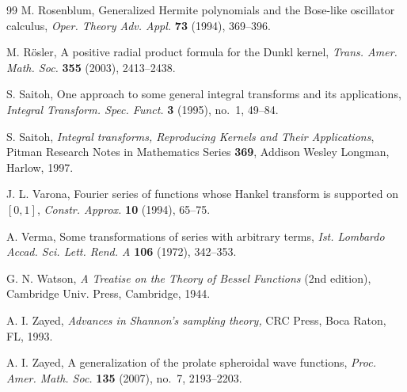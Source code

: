 \documentclass[11pt,a4paper]{amsart}
\theoremstyle{plain}
\theoremstyle{definition}
\begin{document}
\begin{thebibliography}{99}
 M. Rosenblum, {Generalized Hermite polynomials and the
Bose-like oscillator calculus,} \textit{Oper. Theory Adv. Appl.} \textbf{73}
(1994), 369--396.

 M. R\"osler, {A positive radial product formula
for the Dunkl kernel,} \textit{Trans. Amer. Math. Soc.} \textbf{355}
(2003), 2413--2438.

 S. Saitoh, {One approach to some general integral
transforms and its applications}, \textit{Integral Transform. Spec. Funct.}
\textbf{3} (1995), no.~1, 49--84.

 S. Saitoh, \textit{Integral transforms, Reproducing Kernels and Their Applications},
Pitman Research Notes in Mathematics Series \textbf{369},
Addison Wesley Longman, Harlow, 1997.

 J. L. Varona, {Fourier series of functions whose Hankel transform is supported on $[0,1]$}, 
\textit{Constr. Approx.} \textbf{10} (1994), 65--75.

 A. Verma, {Some transformations of series with arbitrary terms}, 
\textit{Ist. Lombardo Accad. Sci. Lett. Rend. A} \textbf{106} (1972), 342--353.

 G. N. Watson, \textit{A Treatise on the Theory of
Bessel Functions} (2nd edition), Cambridge Univ. Press,
Cambridge, 1944.

 A. I. Zayed, \textit{Advances in Shannon's sampling theory,} 
CRC Press, Boca Raton, FL, 1993.

 A. I. Zayed, {A generalization of the prolate spheroidal wave
functions,} \textit{Proc. Amer. Math. Soc.} \textbf{135} (2007), no.~7, 2193--2203.


\end{thebibliography}


\end{document}
